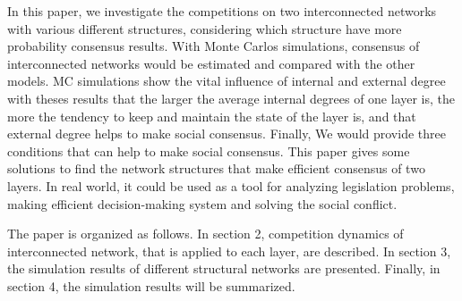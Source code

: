 \documentclass[english]{cccconf}
\begin{document}
In this paper, we investigate the competitions on two interconnected networks with various different structures, considering which structure have more probability consensus results. With Monte Carlos simulations, consensus of interconnected networks would be estimated and compared with the other models. MC simulations show the vital influence of internal and external degree with theses results that the larger the average internal degrees of one layer is, the more the tendency to keep and maintain the state of the layer is, and that external degree helps to make social consensus. Finally, We would provide three conditions that can help to make social consensus. This paper gives some solutions to find the network structures that make efficient consensus of two layers. In real world, it could be used as a tool for analyzing legislation problems, making efficient decision-making system and solving the social conflict.  

The paper is organized as follows. In section 2, competition dynamics of interconnected network, that is applied to each layer, are described. In section 3, the simulation results of different structural networks are presented. Finally, in section 4, the simulation results will be summarized.
\end{document}
